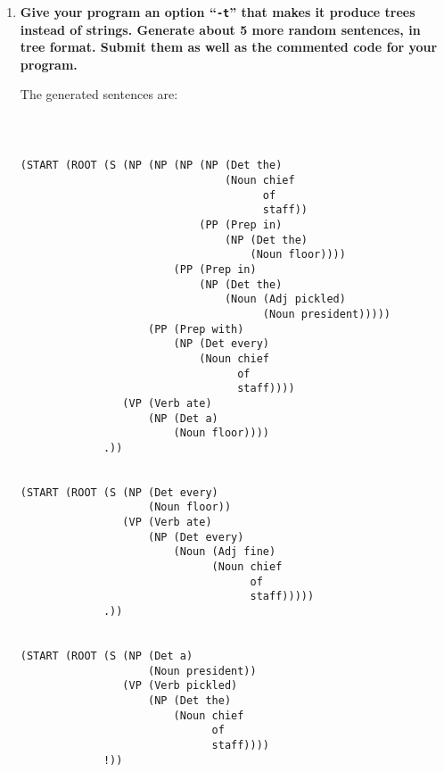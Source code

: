 \documentclass[10pt]{article}
\begin{document}
\begin{enumerate}
{\bf Other}

I also added any missing words to the vocabulary as was necessary.


\item {\bf Give your program an option ``\verb|-t|'' that makes it produce
  trees instead of strings. Generate about 5 more random
sentences, in tree format. Submit them as well as the commented code
for your program.} 

The generated sentences are:

{\tt
\begin{verbatim}

(START (ROOT (S (NP (NP (NP (NP (Det the)
                                (Noun chief
                                      of
                                      staff))
                            (PP (Prep in)
                                (NP (Det the)
                                    (Noun floor))))
                        (PP (Prep in)
                            (NP (Det the)
                                (Noun (Adj pickled)
                                      (Noun president)))))
                    (PP (Prep with)
                        (NP (Det every)
                            (Noun chief
                                  of
                                  staff))))
                (VP (Verb ate)
                    (NP (Det a)
                        (Noun floor))))
             .))


(START (ROOT (S (NP (Det every)
                    (Noun floor))
                (VP (Verb ate)
                    (NP (Det every)
                        (Noun (Adj fine)
                              (Noun chief
                                    of
                                    staff)))))
             .))


(START (ROOT (S (NP (Det a)
                    (Noun president))
                (VP (Verb pickled)
                    (NP (Det the)
                        (Noun chief
                              of
                              staff))))
             !))



\end{verbatim}}
\end{enumerate}
\end{document}
